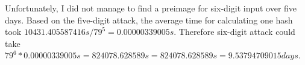 \documentclass[runningheads,a4paper]{llncs}
\begin{document}
Unfortunately, I did not manage to find a preimage for six-digit input over five days. Based on the five-digit attack, the average time for calculating one hash took $10431.405587416s/79^5  =0.00000339005s$. Therefore six-digit attack could take $79^6 * 0.00000339005s = 824078.628589s = 824078.628589s = 9.53794709015days$.




\end{document}
